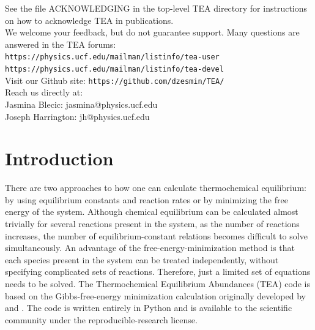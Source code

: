 \begin{center}
\begin{minipage}{.8\textwidth}
See the file ACKNOWLEDGING in the top-level TEA directory for              
instructions on how to acknowledge TEA in publications.  \\                  
                                                                           
We welcome your feedback, but do not guarantee support.                    
Many questions are answered in the TEA forums:   \\                          
                                                                          
{\tt https://physics.ucf.edu/mailman/listinfo/tea-user}                          
{\tt https://physics.ucf.edu/mailman/listinfo/tea-devel}   \\                      
                                                                           
Visit our Github site:                               
{\tt https://github.com/dzesmin/TEA/}   \\                                         
                                                                           
Reach us directly at:                                                      
\\ Jasmina Blecic: jasmina@physics.ucf.edu 
\\ Joseph Harrington: jh@physics.ucf.edu \\                                     

\end{minipage}
\end{center}
\vfill %
\clearpage


\newpage
\tableofcontents
\newpage

\section{Introduction}
\label{intro}

  There are two approaches to how one can calculate thermochemical
  equilibrium: by using equilibrium constants and reaction rates or by
  minimizing the free energy of the system. Although chemical
  equilibrium can be calculated almost trivially for several reactions
  present in the system, as the number of reactions increases, the
  number of equilibrium-constant relations becomes difficult to solve
  simultaneously.  An advantage of the free-energy-minimization method
  is that each species present in the system can be treated
  independently, without specifying complicated sets of reactions.
  Therefore, just a limited set of equations needs to be solved. The
  Thermochemical Equilibrium Abundances (TEA) code is based on the
  Gibbs-free-energy minimization calculation originally developed
  by \citet{WhiteJohnsonDantzig1958JGibbs}
  and \citet{Eriksson1971}. The code is written entirely in Python and
  is available to the scientific community under the reproducible-research
  license.


